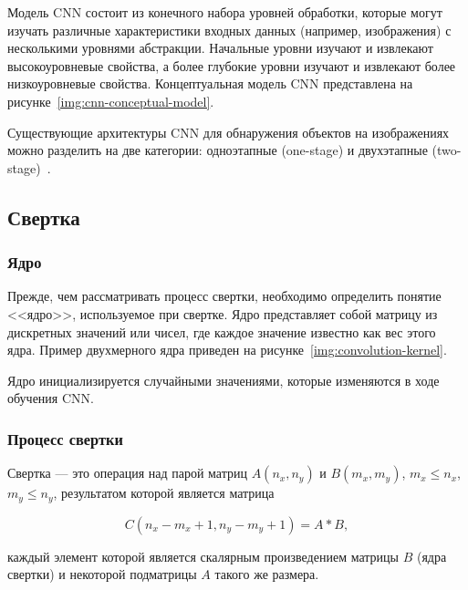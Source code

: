 Модель CNN состоит из конечного набора уровней обработки, которые могут изучать различные характеристики входных данных (например, изображения) с несколькими уровнями абстракции. Начальные уровни изучают и извлекают высокоуровневые свойства, а более глубокие уровни изучают и извлекают более низкоуровневые свойства. Концептуальная модель CNN представлена на рисунке~\ref{img:cnn-conceptual-model}.


Существующие архитектуры CNN для обнаружения объектов на изображениях можно разделить на две категории: одноэтапные (one-stage) и двухэтапные (two-stage)~\cite{review-on-one-stage-object-detection}.    

\subsection{Свертка}

\subsubsection*{Ядро}

Прежде, чем рассматривать процесс свертки, необходимо определить понятие <<ядро>>, используемое при свертке. Ядро представляет собой матрицу из дискретных значений или чисел, где каждое значение известно как вес этого ядра. Пример двухмерного ядра приведен на рисунке~\ref{img:convolution-kernel}.


Ядро инициализируется случайными значениями, которые изменяются в ходе обучения CNN.

\subsubsection*{Процесс свертки}

Свертка --- это операция над парой матриц $A(n_x, n_y)$ и $B(m_x, m_y)$, $m_x  \le n_x$, $m_y \le n_y$, результатом которой является матрица 

\begin{equation}
C(n_x - m_x +1, n_y - m_y + 1) = A * B,
\end{equation}

каждый элемент которой является скалярным произведением матрицы $B$ (ядра свертки) и некоторой подматрицы $A$ такого же размера.

